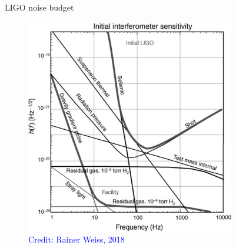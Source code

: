 \documentclass[pdf]{beamer}
\newcommand{\credit}[1]{\tiny{\textcolor{blue}{Credit: #1}}}
\begin{document}
\begin{frame}{LIGO noise budget}
\begin{figure}
\includegraphics[scale=.7]{fig/LIGO sensitivity noise budget.jpg}
\caption*{\credit{Rainer Weiss, 2018}}
\end{figure}
\end{frame}
\end{document}
